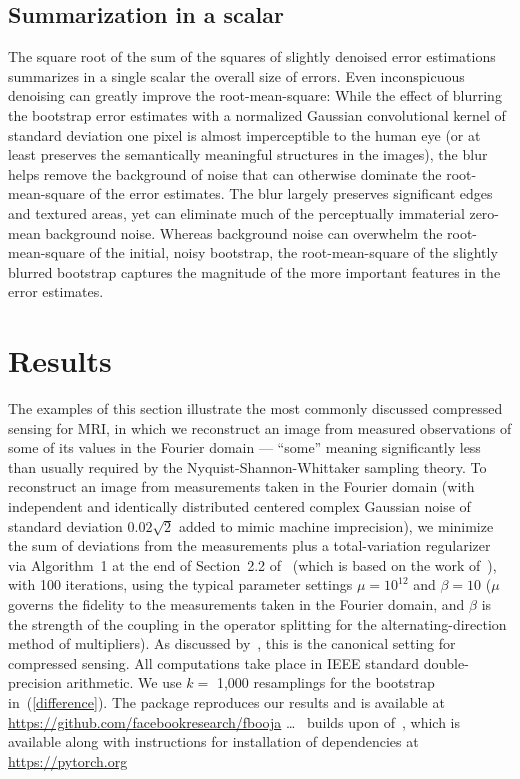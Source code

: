 \documentclass[article]{jdssv}
\begin{document}
\subsection{Summarization in a scalar}
\label{sum}

The square root of the sum of the squares of slightly denoised error
estimations summarizes in a single scalar the overall size of errors.
Even inconspicuous denoising can greatly improve the root-mean-square:
While the effect of blurring the bootstrap error estimates
with a normalized Gaussian convolutional kernel of standard deviation one pixel
is almost imperceptible to the human eye (or at least preserves
the semantically meaningful structures in the images),
the blur helps remove the background of noise that can otherwise dominate
the root-mean-square of the error estimates.
The blur largely preserves significant edges and textured areas, yet
can eliminate much of the perceptually immaterial zero-mean background noise.
Whereas background noise can overwhelm the root-mean-square
of the initial, noisy bootstrap, the root-mean-square
of the slightly blurred bootstrap captures the magnitude
of the more important features in the error estimates.




\section{Results}
\label{results}

The examples of this section illustrate
the most commonly discussed compressed sensing for MRI,
in which we reconstruct an image from measured observations of some
of its values in the Fourier domain --- ``some'' meaning significantly less
than usually required by the Nyquist-Shannon-Whittaker sampling theory.
To reconstruct an image from measurements taken in the Fourier domain
(with independent and identically distributed centered complex Gaussian noise
of standard deviation $0.02\sqrt{2}$ added to mimic machine imprecision),
we minimize the sum of deviations from the measurements
plus a total-variation regularizer
via Algorithm~1 at the end of Section~2.2 of~\citet{tao-yang}
(which is based on the work of~\citet{yang-zhang}), with 100 iterations,
using the typical parameter settings $\mu = 10^{12}$ and $\beta = 10$
($\mu$ governs the fidelity to the measurements taken in the Fourier domain,
and $\beta$ is the strength of the coupling in the operator splitting
for the alternating-direction method of multipliers).
As discussed by~\citet{tropp}, this is the canonical setting
for compressed sensing.
All computations take place in IEEE standard double-precision arithmetic.
We use $k =$ 1,000 resamplings for the bootstrap in~(\ref{difference}).
The  package  reproduces our results and
is available at \url{https://github.com/facebookresearch/fbooja}
\dots\  builds upon 
of~\citet{pytorch}, which is available along with instructions for installation
of dependencies at \url{https://pytorch.org}
\end{document}
